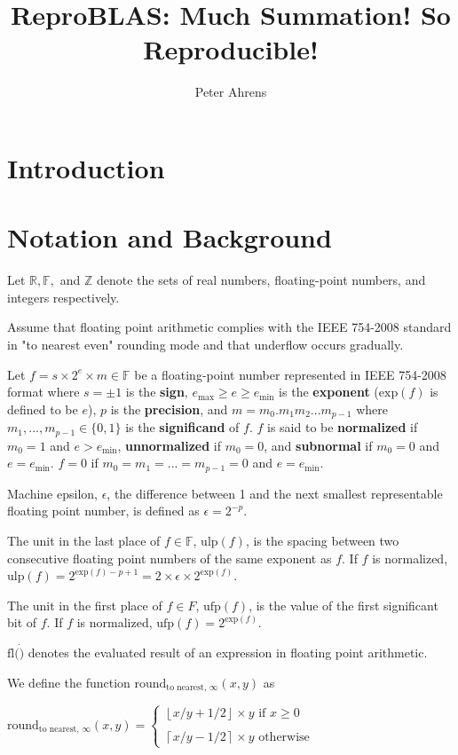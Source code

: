 \documentclass[12pt]{article}
\author{Peter Ahrens}
\title{ReproBLAS: Much Summation! So Reproducible!}
\providecommand{\ceil}[1]{\left \lceil #1 \right \rceil }
\providecommand{\floor}[1]{\left \lfloor #1 \right \rfloor }
\providecommand{\R}{\ensuremath{\mathbb{R}}}
\providecommand{\F}{\ensuremath{\mathbb{F}}}
\providecommand{\Z}{\ensuremath{\mathbb{Z}}}
\providecommand{\exp}{\ensuremath{\text{exp}}}
\providecommand{\min}{\ensuremath{\text{min}}}
\providecommand{\max}{\ensuremath{\text{max}}}
\providecommand{\ulp}{\ensuremath{\text{ulp}}}
\providecommand{\ufp}{\ensuremath{\text{ufp}}}
\providecommand{\fl}{\ensuremath{\text{fl}}}
\providecommand{\roundtonearestinfty}{\ensuremath{\text{round}_\text{to nearest, $\infty$}}}
\theoremstyle{plain}
\begin{document}
\noindent
\maketitle
\tableofcontents
\newpage
\section{Introduction}

\section{Notation and Background}
  Let $\R, \F, $ and $\Z$ denote the sets of real numbers, floating-point numbers, and integers respectively.

  Assume that floating point arithmetic complies with the IEEE 754-2008 standard \cite{ieee754} in "to nearest even" rounding mode and that underflow occurs gradually.

  Let $f = s \times 2^e \times m \in \F$ be a floating-point number represented in IEEE 754-2008 format \cite{ieee754} where $s = \pm 1$ is the \textbf{sign}, $e_{\max} \geq e \geq e_{\min}$ is the \textbf{exponent} ($\exp(f)$ is defined to be $e$), $p$ is the \textbf{precision}, and $m = m_0.m_1m_2...m_{p-1}$ where $m_1, ..., m_{p - 1} \in \{0, 1\}$ is the \textbf{significand} of $f$. $f$ is said to be \textbf{normalized} if $m_0 = 1$ and $e > e_{\min}$, \textbf{unnormalized} if $m_0 = 0$, and \textbf{subnormal} if $m_0 = 0$ and $e = e_{\min}$. $f = 0$ if $m_0 = m_1 = ... = m_{p - 1} = 0$ and $e = e_{\min}$.

  Machine epsilon, $\epsilon$, the difference between 1 and the next smallest representable floating point number, is defined as $\epsilon = 2^{-p}$.

  The unit in the last place of $f \in \F$, $\ulp(f)$, is the spacing between two consecutive floating point numbers of the same exponent as $f$. If $f$ is normalized, $\ulp(f) = 2^{\exp(f) - p + 1} = 2 \times \epsilon \times 2^{\exp(f)}$.

  The unit in the first place of $f \in F$, $\ufp(f)$, is the value of the first significant bit of $f$. If $f$ is normalized, $\ufp(f) = 2^{\exp(f)}$.

  $\fl(\dot)$ denotes the evaluated result of an expression in floating point arithmetic.

  We define the function $\roundtonearestinfty(x, y)$ as

  $\roundtonearestinfty(x, y) = \begin{cases}\floor{x/y + 1/2} \times y \text{ if } x \geq 0\\ \\ \ceil{x/y - 1/2}\times y \text{ otherwise}\end{cases}$
\end{document}
